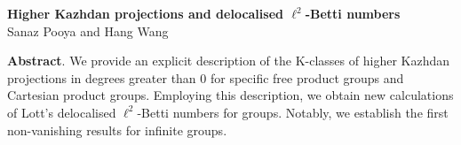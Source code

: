 \documentclass[a4paper,leqno,12pt]{article}
\numberwithin{equation}{section}
\theoremstyle{plain}
\theoremstyle{definition}
\theoremstyle{remark}
\newcommand{\authors}{Sanaz Pooya and Hang Wang}
\renewcommand{\title}{Higher Kazhdan projections and delocalised $\ell^ 2$-Betti numbers}
\begin{document}
	
	
	
	\thispagestyle{empty}
	
	\noindent
	\begin{minipage}{\linewidth}
		\begin{center}
			\textbf{\Large \title} \\
			\authors    
		\end{center}
	\end{minipage}
	
	\renewcommand{\thefootnote}{}
	
	\vspace{2em}
	\noindent
	\begin{minipage}{\linewidth}
		\textbf{Abstract}.  We provide an explicit description of the K-classes of higher Kazhdan projections in degrees greater than 0 for specific free product groups and Cartesian product groups.   
		Employing this description, we obtain new calculations of Lott's delocalised $\ell^2$-Betti numbers for groups. Notably, we establish the first non-vanishing results for infinite groups.	 
		
	\end{minipage}
	
	
	
	
\end{document}
